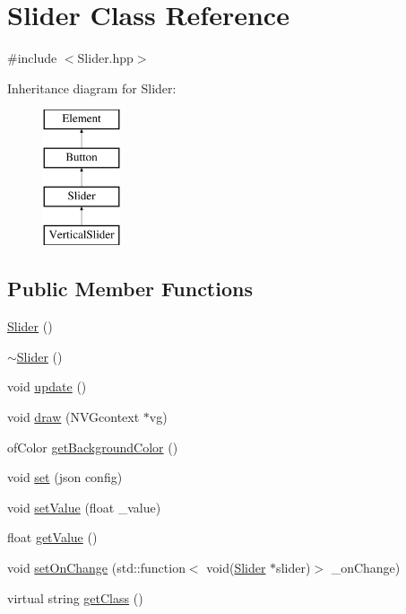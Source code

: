 \hypertarget{class_slider}{}\section{Slider Class Reference}
\label{class_slider}


{\ttfamily \#include $<$Slider.\+hpp$>$}

Inheritance diagram for Slider\+:\begin{figure}[H]
\begin{center}
\leavevmode
\includegraphics[height=4.000000cm]{class_slider}
\end{center}
\end{figure}
\subsection*{Public Member Functions}
\begin{DoxyCompactItemize}
\item 
\hyperlink{class_slider_a535033fada8e25ef7291d2a52e6e437b}{Slider} ()
\item 
\hyperlink{class_slider_aaca12abbe07a83f925d66339aa332028}{$\sim$\+Slider} ()
\item 
void \hyperlink{class_slider_a8bcc94829fa9c1546097da4e797665cb}{update} ()
\item 
void \hyperlink{class_slider_a1db885ef790b09aee48c7344181c5424}{draw} (N\+V\+Gcontext $\ast$vg)
\item 
of\+Color \hyperlink{class_slider_aceedad7b0b2355dd3a7923e7befcff67}{get\+Background\+Color} ()
\item 
void \hyperlink{class_slider_a834dbe16812e7bd4f0472882b0619ea9}{set} (json config)
\item 
void \hyperlink{class_slider_a2b857d6483469bde177871f38e47097e}{set\+Value} (float \+\_\+value)
\item 
float \hyperlink{class_slider_a8202efdd0e9c26277e7934949ae87537}{get\+Value} ()
\item 
void \hyperlink{class_slider_a2c072af3ce9213e5a097da49d1af8a82}{set\+On\+Change} (std\+::function$<$ void(\hyperlink{class_slider}{Slider} $\ast$slider)$>$ \+\_\+on\+Change)
\item 
virtual string \hyperlink{class_slider_a0e917883961af99856847e571a461689}{get\+Class} ()
\end{DoxyCompactItemize}
